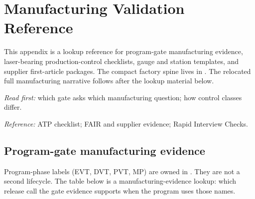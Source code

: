 \chapter{Manufacturing Validation Reference}
\label{app:manufacturing-reference}

This appendix is a lookup reference for program-gate manufacturing evidence,
laser-bearing production-control checklists, gauge and station templates, and
supplier first-article packages. The compact factory spine lives in
. The relocated full manufacturing
narrative follows after the lookup material below.

\textit{Read first:} which gate asks which manufacturing question; how control
classes differ.

\textit{Reference:} ATP checklist; FAIR and supplier evidence; Rapid Interview
Checks.

\section{Program-gate manufacturing evidence}
\label{sec:mfg-npi-reference}

Program-phase labels (EVT, DVT, PVT, MP) are owned in
. They are not a second
lifecycle. The table below is a manufacturing-evidence lookup: which release
call the gate evidence supports when the program uses those names.

